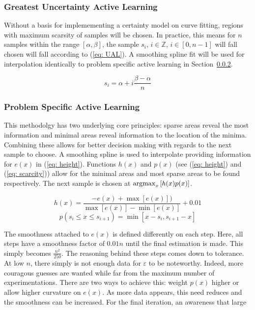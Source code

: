 \subsubsection{Greatest Uncertainty Active Learning}
Without a basis for implemementing a certainty model on curve fitting, regions with maximum scarsity of samples will be chosen. In practice, this means for $n$ samples within the range $[\alpha, \beta]$, the sample $s_i$, $i\in\mathbb{Z}$, $i\in[0, n-1]$ will fall chosen will fall according to (\ref{eq: UAL}). A smoothing spline fit will be used for interpolation identically to problem specific active learning in Section~\ref{sssec:Active Learning}.

\begin{equation}
  \label{eq: UAL}
  s_i=\alpha+i\frac{\beta-\alpha}{n}
\end{equation}

\subsubsection{Problem Specific Active Learning}
\label{sssec:Active Learning}
This methodolgy has two underlying core principles: sparse areas reveal the most information and minimal areas reveal information to the location of the minima. Combining these allows for better decision making with regards to the next sample to choose. A smoothing spline is used to interpolate providing information for $e(x)$ in (\ref{eq: height}). Functions $h(x)$ and $p(x)$ (see (\ref{eq: height}) and (\ref{eq: scarcity})) allow for the minimal areas and most sparse areas to be found respectively. The next sample is chosen at ${\operatorname*{argmax}_x{[h(x)p(x)]}}$.

\begin{equation}
  \label{eq: height}
  {h(x)=\frac{-e(x)+\max[e(x)])}{\max[e(x)]-\min[e(x)]}}+0.01
\end{equation}
\begin{equation}
  \label{eq: scarcity}
  p(s_i \le x \le s_{i+1})=\min[x-s_i, s_{i+1}-x]
\end{equation}

The smoothness attached to $e(x)$ is defined differently on each step. Here, all steps have a smoothness factor of $0.01n$ until the final estimation is made. This simply becomes $\frac{n^2}{250}$. The reasoning behind these steps comes down to tolerance. At low $n$, there simply is not enough data for $\varepsilon$ to be noteworthy. Indeed, more couragous guesses are wanted while far from the maximum number of experimentations. There are two ways to achieve this: weight $p(x)$ higher or allow higher curvature on $e(x)$. As more data appears, this need reduces and the smoothness can be increased. For the final iteration, an awareness that large 

